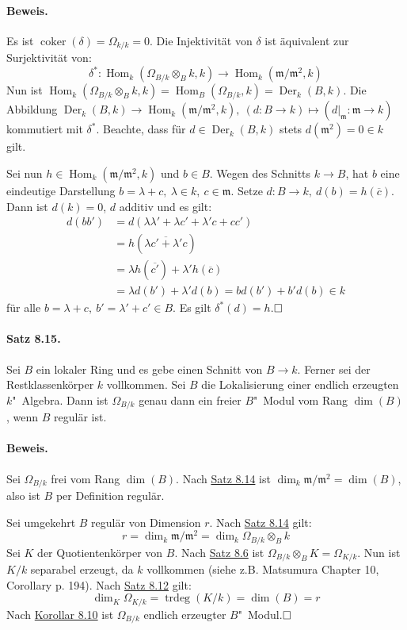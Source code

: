 \documentclass[11pt,b5paper,openany]{memoir}
\def \qed {$\hfill\square$}
\begin{document}
\paragraph{Beweis.} Es ist $\operatorname{coker}(\delta)=\Omega_{k/k}=0$. Die Injektivität von $\delta$ ist äquivalent zur Surjektivität von:
\[\delta^\ast :\operatorname{Hom}_k(\Omega_{B/k}\otimes_B k,k)\to\operatorname{Hom}_k(\mathfrak{m}/\mathfrak{m}^2,k) \]
Nun ist $\operatorname{Hom}_k(\Omega_{B/k}\otimes_B k,k) = \operatorname{Hom}_B(\Omega_{B/k},k)=\operatorname{Der}_k(B,k)$. Die Abbildung $\operatorname{Der}_k(B,k)\to\operatorname{Hom}_k(\mathfrak{m}/\mathfrak{m}^2,k),\ (d:B\to k)\mapsto (d|_\mathfrak{m}:\mathfrak{m}\to k)$ kommutiert mit $\delta^\ast$. Beachte, dass für $d\in\operatorname{Der}_k(B,k)$ stets $d(\mathfrak{m}^2)=0\in k$ gilt.

Sei nun $h\in\operatorname{Hom}_k(\mathfrak{m}/\mathfrak{m}^2,k)$ und $b\in B$. Wegen des Schnitts $k\to B$, hat $b$ eine eindeutige Darstellung $b=\lambda+c,\ \lambda\in k,\ c\in\mathfrak{m}$. Setze $d:B\to k,\ d(b) =h(\overline{c})$. Dann ist $d(k)=0$, $d$ additiv und es gilt:
\begin{align*}
d(bb') &= d(\lambda\lambda'+\lambda c'+\lambda' c+cc')\\
&= h(\overline{\lambda c'+\lambda' c})\\
&= \lambda h(\overline{c'}) + \lambda' h(\overline{c})\\
&= \lambda d(b')+\lambda' d(b)= bd(b')+b'd(b)\in k
\end{align*}
für alle $b=\lambda+c,\ b'=\lambda'+c'\in B$. Es gilt $\delta^\ast (d)=h$.\qed

\paragraph{Satz 8.15.}\label{8.15} Sei $B$ ein lokaler Ring und es gebe einen Schnitt von $B\to k$. Ferner sei der Restklassenkörper $k$ vollkommen. Sei $B$ die Lokalisierung einer endlich erzeugten $k$"~Algebra. Dann ist $\Omega_{B/k}$ genau dann ein freier $B$"~Modul vom Rang $\dim(B)$, wenn $B$ regulär ist.

\paragraph{Beweis.} Sei $\Omega_{B/k}$ frei vom Rang $\dim(B)$. Nach \hyperref[8.14]{Satz 8.14} ist $\dim_k\mathfrak{m}/\mathfrak{m}^2=\dim(B)$, also ist $B$ per Definition regulär.

Sei umgekehrt $B$ regulär von Dimension $r$. Nach \hyperref[8.14]{Satz 8.14} gilt:
\[r =\dim_k\mathfrak{m}/\mathfrak{m}^2=\dim_k\Omega_{B/k}\otimes_B k \]
Sei $K$ der Quotientenkörper von $B$. Nach \hyperref[8.6]{Satz 8.6} ist $\Omega_{B/k}\otimes_B K=\Omega_{K/k}$. Nun ist $K/k$ separabel erzeugt, da $k$ vollkommen (siehe z.B. Matsumura Chapter 10, Corollary p. 194). Nach \hyperref[8.12]{Satz 8.12} gilt:
\[\dim_K\Omega_{K/k}=\operatorname{trdeg}(K/k)=\dim(B) = r \]
Nach \hyperref[8.10]{Korollar 8.10} ist $\Omega_{B/k}$ endlich erzeugter $B$"~Modul.\qed
\end{document}
